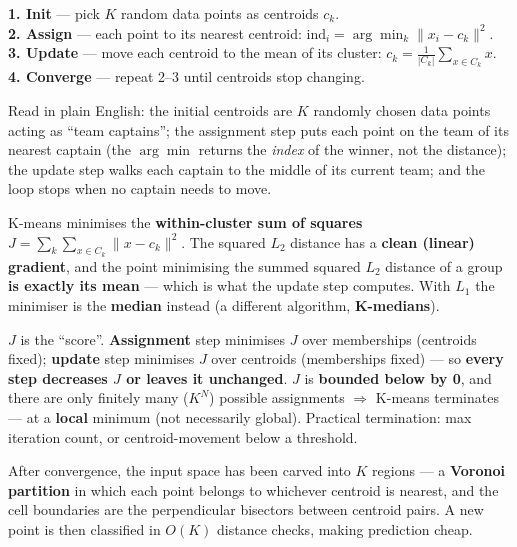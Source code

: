 \documentclass[11pt, a4paper]{article}
\newcommand{\kw}[1]{\textbf{#1}}
\begin{document}
\begin{defbox}[K-means]
\textbf{1. Init} — pick $K$ random data points as centroids $c_k$. \\
\textbf{2. Assign} — each point to its nearest centroid: $\text{ind}_i=\arg\min_k\|x_i-c_k\|^2$. \\
\textbf{3. Update} — move each centroid to the mean of its cluster: $c_k=\frac{1}{|C_k|}\sum_{x\in C_k}x$. \\
\textbf{4. Converge} — repeat 2–3 until centroids stop changing.
\end{defbox}

Read in plain English: the initial centroids are $K$ randomly chosen data points acting as ``team
captains''; the assignment step puts each point on the team of its nearest captain (the $\arg\min$
returns the \emph{index} of the winner, not the distance); the update step walks each captain to the
middle of its current team; and the loop stops when no captain needs to move.

\begin{notebox}
K-means minimises the \kw{within-cluster sum of squares} $J=\sum_k\sum_{x\in C_k}\|x-c_k\|^2$. The
squared $L_2$ distance has a \kw{clean (linear) gradient}, and the point minimising the summed squared
$L_2$ distance of a group \kw{is exactly its mean} — which is what the update step computes. With
$L_1$ the minimiser is the \kw{median} instead (a different algorithm, \kw{K-medians}).
\end{notebox}

\begin{notebox}
$J$ is the ``score''. \kw{Assignment} step minimises $J$ over memberships (centroids fixed);
\kw{update} step minimises $J$ over centroids (memberships fixed) — so \kw{every step decreases $J$ or
leaves it unchanged}. $J$ is \kw{bounded below by 0}, and there are only finitely many ($K^N$)
possible assignments $\Rightarrow$ K-means terminates — at a \kw{local} minimum (not necessarily
global). Practical termination: max iteration count, or centroid-movement below a threshold.
\end{notebox}

After convergence, the input space has been carved into $K$ regions — a \kw{Voronoi partition} in
which each point belongs to whichever centroid is nearest, and the cell boundaries are the
perpendicular bisectors between centroid pairs. A new point is then classified in $O(K)$ distance
checks, making prediction cheap.
\end{document}
